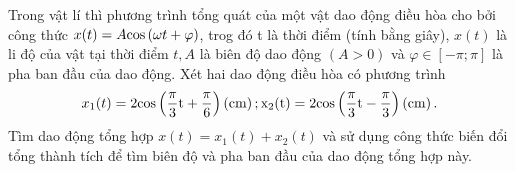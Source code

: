 \begin{ex}%
	Trong vật lí thì phương trình tổng quát của một vật dao động điều hòa cho bởi công thức $ x(t)=A{\rm{cos}}\left(\omega t+\varphi\right)$, trog đó t là thời điểm (tính bằng giây), $ x(t)$ là  li độ của vật tại thời điểm $ t,A$ là biên độ dao động $\left(A > 0\right)$ và $\varphi\in\left[-\pi;\pi\right]$ là pha ban đầu của dao động. Xét hai dao động điều hòa có phương trình
	$$x_1(t)=2\rm{cos}\left(\dfrac{\pi}{3}t+\dfrac{\pi}{6}\right)\left(\rm{cm}\right);  x_2(t)=2\rm{cos}\left(\dfrac{\pi}{3}t-\dfrac{\pi}{3}\right)\left(\rm{cm}\right).$$
	Tìm dao động tổng hợp $ x(t)=x_1(t)+x_2(t)$ và sử dụng công thức biến đổi tổng thành tích để tìm biên độ và pha ban đầu của dao động  tổng hợp này.
\end{ex}


